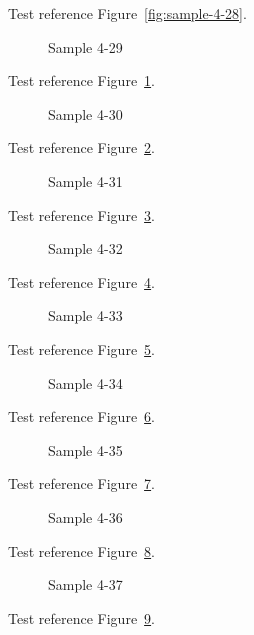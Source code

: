 Test reference Figure~\ref{fig:sample-4-28}.

\begin{figure}[tbhp]
\caption{Sample 4-29}
\label{fig:sample-4-29}
\end{figure}

Test reference Figure~\ref{fig:sample-4-29}.

\begin{figure}[tbhp]
\caption{Sample 4-30}
\label{fig:sample-4-30}
\end{figure}

Test reference Figure~\ref{fig:sample-4-30}.

\begin{figure}[tbhp]
\caption{Sample 4-31}
\label{fig:sample-4-31}
\end{figure}

Test reference Figure~\ref{fig:sample-4-31}.

\begin{figure}[tbhp]
\caption{Sample 4-32}
\label{fig:sample-4-32}
\end{figure}

Test reference Figure~\ref{fig:sample-4-32}.

\begin{figure}[tbhp]
\caption{Sample 4-33}
\label{fig:sample-4-33}
\end{figure}

Test reference Figure~\ref{fig:sample-4-33}.

\begin{figure}[tbhp]
\caption{Sample 4-34}
\label{fig:sample-4-34}
\end{figure}

Test reference Figure~\ref{fig:sample-4-34}.

\begin{figure}[tbhp]
\caption{Sample 4-35}
\label{fig:sample-4-35}
\end{figure}

Test reference Figure~\ref{fig:sample-4-35}.

\begin{figure}[tbhp]
\caption{Sample 4-36}
\label{fig:sample-4-36}
\end{figure}

Test reference Figure~\ref{fig:sample-4-36}.

\begin{figure}[tbhp]
\caption{Sample 4-37}
\label{fig:sample-4-37}
\end{figure}

Test reference Figure~\ref{fig:sample-4-37}.

